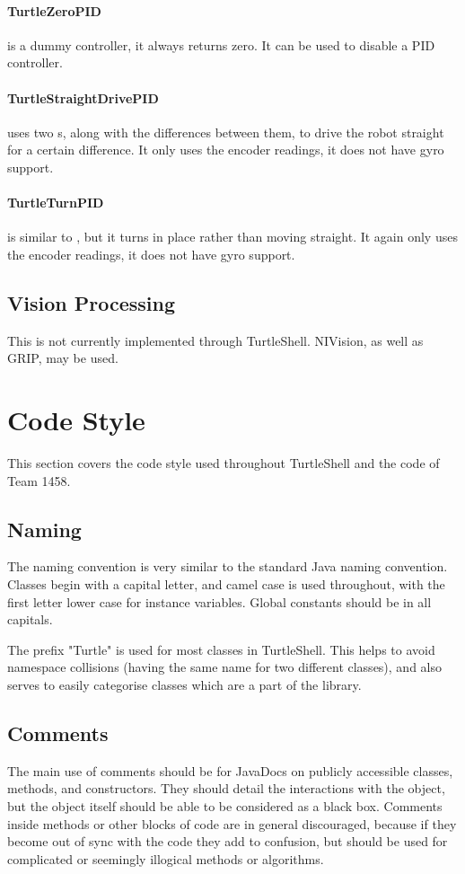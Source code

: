 \documentclass[]{report}
\begin{document}
\paragraph{TurtleZeroPID}
 is a dummy controller, it always returns zero.
It can be used to disable a PID controller.

\paragraph{TurtleStraightDrivePID}
 uses two s, along with the differences between them, to drive the robot straight for a certain difference.
It only uses the encoder readings, it does not have gyro support.

\paragraph{TurtleTurnPID}
 is similar to , but it turns in place rather than moving straight.
It again only uses the encoder readings, it does not have gyro support.


\subsection{Vision Processing}
This is not currently implemented through TurtleShell.
NIVision, as well as GRIP, may be used.


\section{Code Style}
This section covers the code style used throughout TurtleShell and the code of Team 1458.

\subsection{Naming}
The naming convention is very similar to the standard Java naming convention.
Classes begin with a capital letter, and camel case is used throughout, with the first letter lower case for instance variables.
Global constants should be in all capitals.

The prefix "Turtle" is used for most classes in TurtleShell.
This helps to avoid namespace collisions (having the same name for two different classes), and also serves to easily categorise classes which are a part of the library.

\subsection{Comments}
The main use of comments should be for JavaDocs on publicly accessible classes, methods, and constructors.
They should detail the interactions with the object, but the object itself should be able to be considered as a black box.
Comments inside methods or other blocks of code are in general discouraged, because if they become out of sync with the code they add to confusion, but should be used for complicated or seemingly illogical methods or algorithms.
\end{document}
